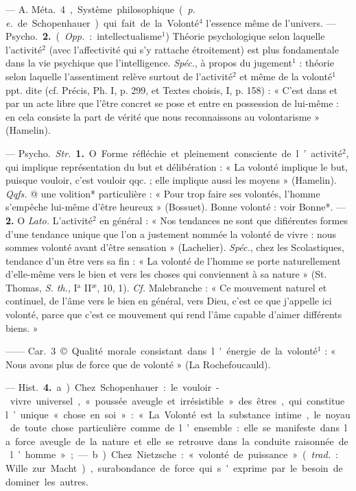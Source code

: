\begin{itemize}[leftmargin=1cm, label=, itemsep=1pt]
 — A. \si{Méta.} 4, Système
philosophique ({\it p. e.} de Schopenhauer)
qui fait de la Volonté$^4$ l'essence
même de l'univers. — \si{Psycho.}
 {\bf 2.} ({\it Opp.} : intellectualisme$^1$) Théorie
psychologique selon laquelle l’activité$^2$ (avec l’affectivité qui s'y rattache étroitement) est plus fondamentale dans la vie psychique que
l'intelligence. {\it Spéc.}, à propos du
jugement$^1$ : théorie selon laquelle
l'assentiment relève surtout de l’activité$^2$ et même de la volonté$^1$ ppt.
dite (cf. Précis, Ph. I, p. 299, et
Textes choisis, I, p. 158) : « C’est
dans et par un acte libre que l'être
concret se pose et entre en possession de lui-même : en cela consiste
la part de vérité que nous reconnaissons au volontarisme » (Hamelin).

 — \si{Psycho.} {\it Str.} {\bf 1.} O. Forme
réfléchie et pleinement consciente de
l’activité$^2$, qui implique représentation du but et délibération : « La
volonté implique le but, puisque
vouloir, c’est vouloir qqc. ; elle implique aussi les moyens » (Hamelin).
{\it Qqfs.} @ une volition* particulière :
« Pour trop faire ses volontés,
l’homme s’empêche lui-même d’être
heureux » (Bossuet). Bonne volonté :
voir Bonne*. —  {\bf 2.} O {\it Lato.} L'activité$^2$
en général : « Nos tendances ne sont
que difiérentes formes d’une tendance unique que l’on a justement
nommée la volonté de vivre : nous
sommes volonté avant d'être sensation » (Lachelier). {\it Spéc.}, chez les
Scolastiques, tendance d’un être vers
sa fin : « La volonté de l’homme se
porte naturellement d'elle-même
vers le bien et vers les choses qui
conviennent à sa nature » (St. Thomas, {\it S. th.}, I$^\text{a}$ II$^\text{æ}$, 10, 1). {\it Cf.} Malebranche : « Ce mouvement naturel
et continuel, de l'âme vers le bien
en général, vers Dieu, c’est ce que
j'appelle ici volonté, parce que c’est
ce mouvement qui rend l'âme capable d'aimer différents biens. »

—— \si{Car.} 3 © Qualité morale
consistant dans l'énergie de la volonté$^1$ : « Nous avons plus de force
que de volonté » (La Rochefoucauld).

— \si{Hist.}  {\bf 4.} a) Chez Schopenhauer :
le vouloir-vivre universel, « poussée
aveugle et irrésistible » des êtres, qui
constitue l’unique « chose en soi » :
« La Volonté est la substance intime,
le noyau de toute chose particulière
comme de l’ensemble : elle se manifeste dans la force aveugle de la
nature et elle se retrouve dans la
conduite raisonnée de l’homme » ; —
b) Chez Nietzsche : « volonté de puissance » ({\it trad.} : Wille zur Macht),
surabondance de force qui s'exprime
par le besoin de dominer les autres.


\end{itemize}
